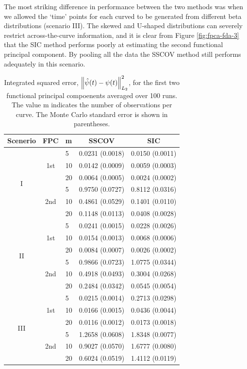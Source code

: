 The most striking difference in performance between the two methods was when we allowed the `time' points for each curved to be generated from different beta distributions (scenario III). The skewed and U-shaped distributions can severely restrict across-the-curve information, and it is clear from Figure \ref{fig:fpca-fda-3} that the SIC method performs poorly at estimating the second functional principal component. By pooling all the data the SSCOV method still performs adequately in this scenario. 
\begin{table}
	[ht] \caption{Integrated squared error, $\left\|\hat{\psi}(t) - \psi(t)\right\|^2_{L_2}$, for the first two functional principal compoenents averaged over 100 runs. The value m indicates the number of observations per curve. The Monte Carlo standard error is shown in parentheses.} \centering 
	\begin{tabular}
		{|c|c|l|cc|} \hline Scenerio & FPC & m & SSCOV & SIC \\
		\hline \multirow{6}{*}{I}& \multirow{3}{*}{1st} & 5 & 0.0231 (0.0018) & 0.0150 (0.0011) \\
		& & 10 & 0.0142 (0.0009) & 0.0059 (0.0003) \\
		& & 20 & 0.0064 (0.0005) & 0.0024 (0.0002) \\
		\cline{2-5} & \multirow{3}{*}{2nd} & 5 & 0.9750 (0.0727) & 0.8112 (0.0316) \\
		& & 10 & 0.4861 (0.0529) & 0.1401 (0.0110) \\
		& & 20 & 0.1148 (0.0113) & 0.0408 (0.0028) \\
		\hline \multirow{6}{*}{II}& \multirow{3}{*}{1st} & 5 & 0.0241 (0.0015) & 0.0228 (0.0026) \\
		& & 10 & 0.0154 (0.0013) & 0.0068 (0.0006) \\
		& & 20 & 0.0084 (0.0007) & 0.0026 (0.0002) \\
		\cline{2-5} & \multirow{3}{*}{2nd} & 5 & 0.9866 (0.0723) & 1.0775 (0.0344) \\
		& & 10 & 0.4918 (0.0493) & 0.3004 (0.0268) \\
		& & 20 & 0.2484 (0.0342) & 0.0545 (0.0054) \\
		\hline \multirow{6}{*}{III} & \multirow{3}{*}{1st} & 5 & 0.0215 (0.0014) & 0.2713 (0.0298) \\
		& & 10 & 0.0166 (0.0015) & 0.0436 (0.0044) \\
		& & 20 & 0.0116 (0.0012) & 0.0173 (0.0018) \\
		\cline{2-5} & \multirow{3}{*}{2nd} & 5 & 1.2658 (0.0608) & 1.8348 (0.0077) \\
		& & 10 & 0.9027 (0.0570) & 1.6777 (0.0080) \\
		& & 20 & 0.6024 (0.0519) & 1.4112 (0.0119) \\
		\hline 
	\end{tabular}
	\label{tab:fpc-norm} 
\end{table}

